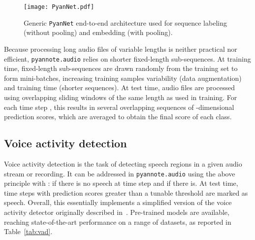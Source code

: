 \documentclass{article}
\begin{document}
\begin{figure*}[]
    \centering
    \texttt{[image: PyanNet.pdf]}
    \caption{Generic {\small \texttt{PyanNet}} end-to-end architecture used for sequence labeling (without pooling) and embedding (with pooling).}
    \label{fig:pyannet}
\end{figure*}

Because processing long audio files of variable lengths is neither practical nor efficient, {\small \texttt{pyannote.audio}} relies on shorter fixed-length sub-sequences. At training time, fixed-length sub-sequences are drawn randomly from the training set to form  mini-batches, increasing training samples variability (data augmentation) and training time (shorter sequences). At test time, audio files are processed using overlapping sliding windows of the same length as used in training. For each time step , this results in several overlapping sequences of -dimensional prediction scores, which are averaged to obtain the final score of each class.

\vspace{-0.17cm}
\subsection{Voice activity detection}
\label{ssec:vad}

Voice activity detection is the task of detecting speech regions in a given audio stream or recording. It can be addressed in {\small\texttt{pyannote.audio}} using the above principle with :  if there is no speech at time step  and  if there is. At test time, time steps with prediction scores greater than a tunable threshold  are marked as speech. Overall, this essentially implements a simplified version of the voice activity detector originally described in~\cite{Gelly2018}. Pre-trained models are available, reaching state-of-the-art performance on a range of datasets, as reported in Table~\ref{tab:vad}.
\end{document}
